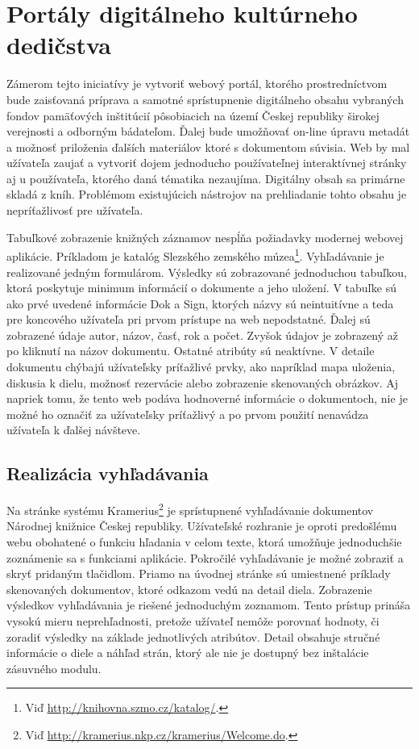 \documentclass[
  print, %
  table,   %
  lof,     %
  nolot,     %
]{fithesis3}
\begin{document}
\chapter{Portály digitálneho kultúrneho dedičstva}	
Zámerom tejto iniciatívy je vytvoriť webový portál, ktorého prostredníctvom bude zaisťovaná príprava a samotné sprístupnenie digitálneho obsahu vybraných fondov pamäťových inštitúcií pôsobiacich na území Českej republiky širokej verejnosti a odborným bádateľom. Ďalej bude umožňovať on-line úpravu metadát a možnosť priloženia ďalších materiálov ktoré s dokumentom súvisia. Web by mal užívateľa zaujať a vytvoriť dojem jednoducho používateľnej interaktívnej stránky aj u používateľa, ktorého daná tématika nezaujíma. Digitálny obsah sa primárne skladá z kníh. Problémom existujúcich nástrojov na prehliadanie tohto obsahu je nepríťažlivosť pre užívateľa. 

Tabuľkové zobrazenie knižných záznamov nespĺňa požiadavky modernej webovej aplikácie. Príkladom je katalóg Slezského zemského múzea\footnote{Viď \url{http://knihovna.szmo.cz/katalog/}.}. Vyhľadávanie je realizované jedným formulárom. Výsledky sú zobrazované jednoduchou tabuľkou, ktorá poskytuje minimum informácií o dokumente a jeho uložení. V tabuľke sú ako prvé uvedené informácie Dok a Sign, ktorých názvy sú neintuitívne a teda pre koncového užívateľa pri prvom prístupe na web nepodstatné. Ďalej sú zobrazené údaje autor, názov, časť, rok a počet. Zvyšok údajov je zobrazený až po kliknutí na názov dokumentu. Ostatné atribúty sú neaktívne. V detaile dokumentu chýbajú užívateľsky príťažlivé prvky, ako napríklad mapa uloženia, diskusia k dielu, možnosť rezervácie alebo zobrazenie skenovaných obrázkov. Aj napriek tomu, že tento web podáva hodnoverné informácie o dokumentoch, nie je možné ho označiť za užívateľsky príťažlivý a po prvom použití nenavádza užívateľa k ďalšej návšteve.
\section{Realizácia vyhľadávania}
Na stránke systému Kramerius\footnote{Viď \url{http://kramerius.nkp.cz/kramerius/Welcome.do}.} je sprístupnené vyhľadávanie dokumentov Národnej knižnice Českej republiky. Užívateľské rozhranie je oproti predošlému webu obohatené o funkciu hľadania v celom texte, ktorá umožňuje jednoduchšie zoznámenie sa s funkciami aplikácie. Pokročilé vyhľadávanie je možné zobraziť a skryť pridaným tlačidlom. Priamo na úvodnej stránke sú umiestnené príklady skenovaných dokumentov, ktoré odkazom vedú na detail diela. Zobrazenie výsledkov vyhľadávania je riešené jednoduchým zoznamom. Tento prístup prináša vysokú mieru neprehľadnosti, pretože užívateľ nemôže porovnať hodnoty, či zoradiť výsledky na základe jednotlivých atribútov. Detail obsahuje
stručné informácie o diele a náhľad strán, ktorý ale nie je dostupný bez inštalácie zásuvného modulu. 
\end{document}
